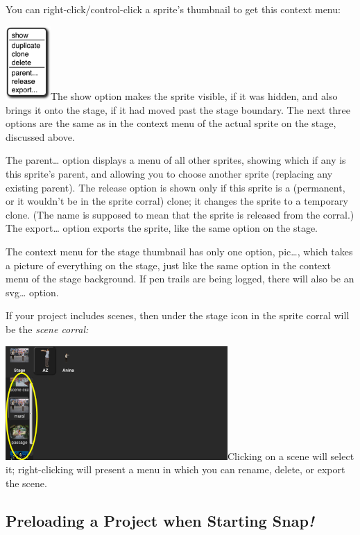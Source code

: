 You can right-click/control-click a sprite's thumbnail to get this
context menu:

\includegraphics[width=0.67708in,height=1.10903in]{media/image1127.png}The
show option makes the sprite visible, if it was hidden, and also brings
it onto the stage, if it had moved past the stage boundary. The next
three options are the same as in the context menu of the actual sprite
on the stage, discussed above.

The parent\ldots{} option displays a menu of all other sprites, showing
which if any is this sprite's parent, and allowing you to choose another
sprite (replacing any existing parent). The release option is shown only
if this sprite is a (permanent, or it wouldn't be in the sprite corral)
clone; it changes the sprite to a temporary clone. (The name is supposed
to mean that the sprite is released from the corral.) The export\ldots{}
option exports the sprite, like the same option on the stage.

The context menu for the stage thumbnail has only one option, pic\ldots,
which takes a picture of everything on the stage, just like the same
option in the context menu of the stage background. If pen trails are
being logged, there will also be an svg\ldots{} option.

If your project includes scenes, then under the stage icon in the sprite
corral will be the \emph{scene corral:}

\includegraphics[width=3.33333in,height=1.70833in]{media/image1128.png}Clicking
on a scene will select it; right-clicking will present a menu in which
you can rename, delete, or export the scene.

\subsection{\texorpdfstring{Preloading a Project when Starting
Snap\emph{!}}{Preloading a Project when Starting Snap!}}\label{preloading-a-project-when-starting-snap}


